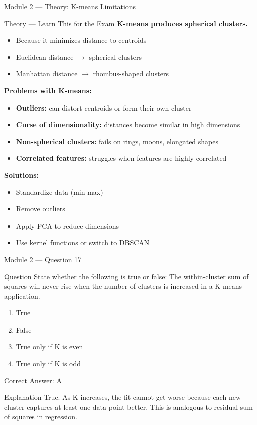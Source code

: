 \documentclass[aspectratio=169,10pt]{beamer}
\newcommand{\question}[1]{%
	\begin{block}{Question}
		#1
	\end{block}
}
\newcommand{\options}[4]{%
	\begin{enumerate}[label=\Alph*.,leftmargin=*]
		\item #1
		\item #2
		\item #3
		\item #4
	\end{enumerate}
}
\newcommand{\answerbox}[1]{%
	\begin{exampleblock}{Correct Answer: #1}
	\end{exampleblock}
}
\newcommand{\explain}[1]{%
	\begin{block}{Explanation}
		\small #1
	\end{block}
}
\newcommand{\theory}[1]{%
	\begin{block}{Theory --- Learn This for the Exam}
		\small #1
	\end{block}
}
\begin{document}
	\begin{frame}{Module 2 --- Theory: K-means Limitations}
		\theory{
			\textbf{K-means produces spherical clusters.}
			\begin{itemize}
				\item Because it minimizes distance to centroids
				\item Euclidean distance $\rightarrow$ spherical clusters
				\item Manhattan distance $\rightarrow$ rhombus-shaped clusters
			\end{itemize}
			\textbf{Problems with K-means:}
			\begin{itemize}
				\item \textbf{Outliers:} can distort centroids or form their own cluster
				\item \textbf{Curse of dimensionality:} distances become similar in high dimensions
				\item \textbf{Non-spherical clusters:} fails on rings, moons, elongated shapes
				\item \textbf{Correlated features:} struggles when features are highly correlated
			\end{itemize}
			\textbf{Solutions:}
			\begin{itemize}
				\item Standardize data (min-max)
				\item Remove outliers
				\item Apply PCA to reduce dimensions
				\item Use kernel functions or switch to DBSCAN
			\end{itemize}
		}
	\end{frame}
	
	\begin{frame}{Module 2 --- Question 17}
		\question{State whether the following is true or false: The within-cluster sum of squares will never rise when the number of clusters is increased in a K-means application.}
		\options{True}{False}{True only if K is even}{True only if K is odd}
		\answerbox{A}
		\explain{True. As K increases, the fit cannot get worse because each new cluster captures at least one data point better. This is analogous to residual sum of squares in regression.}
	\end{frame}
	
\end{document}

